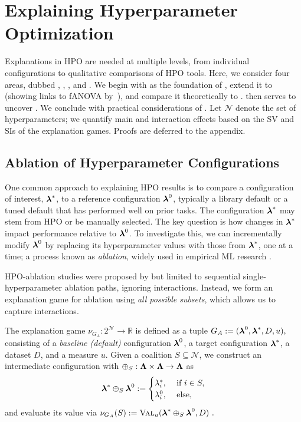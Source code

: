 \documentclass[letterpaper]{article} %
\begin{document}
\section{Explaining Hyperparameter Optimization}\label{sec:hpi-games}

Explanations in HPO are needed at multiple levels, from individual configurations to qualitative comparisons of HPO tools. 
Here, we consider four areas, dubbed \ablation, \sensitivity, \dstunability, and \opthabit.
We begin with \ablation as the foundation of \tool, extend it to \sensitivity (showing links to fANOVA by~\citet{fANOVA}), and compare it theoretically to \dstunability.
\dstunability then serves to uncover \opthabit. We conclude with practical considerations of \tool.
Let $\mathcal N$ denote the set of hyperparameters; we quantify main and interaction effects based on the \gls*{SV} and \glspl*{SI} of the explanation games.
Proofs are deferred to the appendix.

\subsection{Ablation of Hyperparameter Configurations}\label{sec:ablation}

One common approach to explaining HPO results is to compare a configuration of interest, $\boldsymbol{\lambda}^\ast$, to a reference configuration $\boldsymbol{\lambda}^0$, typically a library default or a tuned default that has performed well on prior tasks. The configuration $\boldsymbol{\lambda}^\ast$ may stem from HPO or be manually selected. The key question is how changes in $\boldsymbol{\lambda}^\ast$ impact performance relative to $\boldsymbol{\lambda}^0$. To investigate this, we can incrementally modify $\boldsymbol{\lambda}^0$ by replacing its hyperparameter values with those from $\boldsymbol{\lambda}^\ast$, one at a time; a process known as \emph{ablation}, widely used in empirical ML research \cite{cohen-aimag1988,rendsburg-icml2020,herrmann-icml2024}.

HPO-ablation studies were proposed by \citet{Fawcett-jh16a} but limited to sequential single-hyperparameter ablation paths, ignoring interactions.
Instead, we form an explanation game for ablation using \emph{all possible subsets}, which allows us to capture interactions.




\begin{definition}
The \ablation explanation game $\nu_{G_A}: 2^{\mathcal N} \to \mathbb{R}$ is defined as a tuple $G_A := (\boldsymbol{\lambda}^0, \boldsymbol{\lambda}^\ast, D, u),$
consisting of a \emph{baseline (default)} configuration $\boldsymbol{\lambda}^0$,
a target configuration $\boldsymbol{\lambda}^\ast$, a dataset $D$, and a measure $u$.
Given a coalition $S\subseteq \mathcal{N}$, we construct an intermediate configuration with $\oplus_S: \boldsymbol{\Lambda} \times \boldsymbol{\Lambda} \to \boldsymbol{\Lambda}$ as
\[
\boldsymbol{\lambda}^* \oplus_S \boldsymbol{\lambda}^0 := \begin{cases}
\lambda^\ast_i, & \text{ if } i \in S,\\
\lambda^0_i, & \text{ else},
\end{cases}
\]
and evaluate its value via
$\nu_{G_A}(S) := \textsc{Val}_u(\boldsymbol{\lambda}^\ast \oplus_S \boldsymbol{\lambda}^0, D) \,\, .$
\end{definition}
\end{document}

